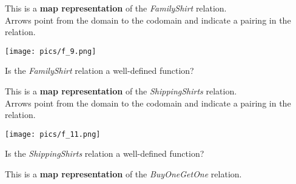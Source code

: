 \documentclass{ximera}
\author{Lee Wayand}
\begin{document}
\begin{exercise}


\begin{question}

This is a \textbf{map representation} of the \textit{FamilyShirt} relation. \\

Arrows point from the domain to the codomain and indicate a pairing in the relation.

\begin{image}
\texttt{[image: pics/f\_9.png]}
\end{image}

Is the \textit{FamilyShirt} relation a well-defined function?

\begin{multipleChoice}
\end{multipleChoice}

\end{question}






\begin{question}

This is a \textbf{map representation} of the \textit{ShippingShirts} relation. \\

Arrows point from the domain to the codomain and indicate a pairing in the relation.

\begin{image}
\texttt{[image: pics/f\_11.png]}
\end{image}

Is the \textit{ShippingShirts} relation a well-defined function?

\begin{multipleChoice}
\end{multipleChoice}

\end{question}











\begin{question}

This is a \textbf{map representation} of the \textit{BuyOneGetOne} relation. \\


\end{question}
\end{exercise}
\end{document}
